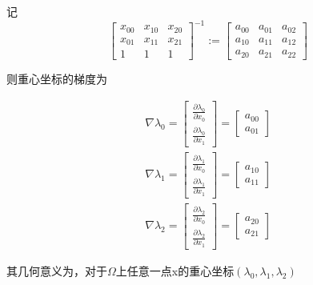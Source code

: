记
\begin{equation}
	\left[\begin{array}{ccc}
		x_{00} & x_{10} & x_{20} \\
		x_{01} & x_{11} & x_{21} \\
		1 & 1 & 1
	\end{array}\right]^{-1}
	:=
	\left[\begin{array}{lll}
		a_{00} & a_{01} & a_{02} \\
		a_{10} & a_{11} & a_{12} \\
		a_{20} & a_{21} & a_{22}
	\end{array}\right]
\end{equation}

则重心坐标的梯度为

\begin{equation}
	\begin{array}{l}
		\nabla \lambda_{0}=\left[\begin{array}{l}
			\frac{\partial \lambda_{0}}{\partial x_{0}} \\
			\frac{\partial \lambda_{0}}{\partial x_{1}}
		\end{array}\right]=\left[\begin{array}{l}
			a_{00} \\
			a_{01}
		\end{array}\right] \\
		\nabla \lambda_{1}=\left[\begin{array}{l}
			\frac{\partial \lambda_{1}}{\partial x_{0}} \\
			\frac{\partial \lambda_{1}}{\partial x_{1}}
		\end{array}\right]=\left[\begin{array}{l}
			a_{10} \\
			a_{11}
		\end{array}\right] \\
		\nabla \lambda_{2}=\left[\begin{array}{l}
			\frac{\partial \lambda_{2}}{\partial x_{0}} \\
			\frac{\partial \lambda_{2}}{\partial x_{1}}
		\end{array}\right]=\left[\begin{array}{l}
			a_{20} \\
			a_{21}
		\end{array}\right]
	\end{array}
\end{equation}


其几何意义为，对于$\Omega$上任意一点x的重心坐标$(\lambda_{0},\lambda_{1},\lambda_{2})$

